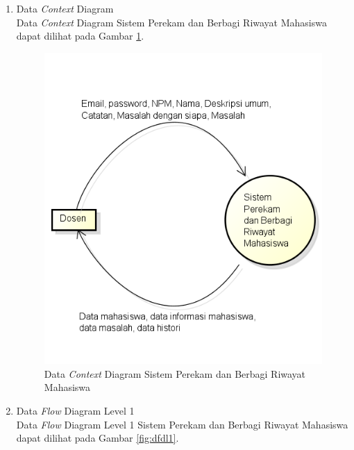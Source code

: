 \begin{enumerate}[(1)]
\item Data {\it Context} Diagram\\
Data {\it Context} Diagram Sistem Perekam dan Berbagi Riwayat Mahasiswa dapat dilihat pada Gambar \ref{fig:dcd}.
  
\begin{figure}[p]
\centering
\includegraphics[scale=1]{Gambar/datacontextdiagram.png}
\caption[Data {\it Context} Diagram Sistem Perekam dan Berbagi Riwayat Mahasiswa]{Data
{\it Context} Diagram Sistem Perekam dan Berbagi Riwayat Mahasiswa}
\label{fig:dcd}
\end{figure}
  
  \item Data {\it Flow} Diagram Level 1\\
  Data {\it Flow} Diagram Level 1 Sistem Perekam dan Berbagi Riwayat Mahasiswa dapat dilihat
  pada Gambar \ref{fig:dfdl1}.
  

\end{enumerate}
